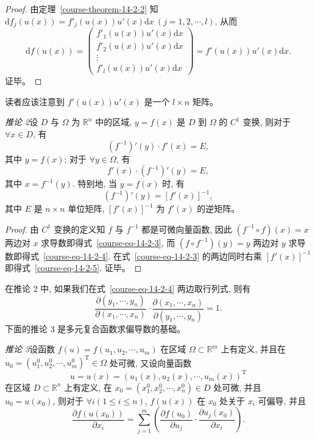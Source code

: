\documentclass[UTF8,12pt,a4paper,fontset=fandol]{ctexart}
\begin{document}
\begin{proof}\quad 由定理~\ref{course-theorem-14-2-2}  知 $\mathrm df_j(u(x))=f'_j(u(x))u'(x)\mathrm dx\ (j=1,2,\cdots,l)$, 从而
\[
  \mathrm df(u(x))=
  \begin{pmatrix}
    f'_1(u(x))u'(x)\mathrm dx\\
    f'_2(u(x))u'(x)\mathrm dx\\
    \vdots\\
    f'_l(u(x))u'(x)\mathrm dx
  \end{pmatrix}
  =f'(u(x))u'(x)\mathrm dx.
\]
证毕。

\end{proof}
\begin{remark}\quad 读者应该注意到 $f'(u(x))u'(x)$ 是一个 $l\times n$ 矩阵。

\end{remark}
\noindent\emph{推论 2}\quad 设 $D$ 与 $\Omega$ 为 $\mathbb R^n$ 中的区域, $y=f(x)$ 是 $D$ 到 $\Omega$ 的 $C^1$ 变换, 则对于 $\forall x\in D$, 有
\begin{equation}
  (f^{-1})'(y)\cdot f'(x)=E,
\label{course-eq-14-2-3}
\end{equation}
其中 $y=f(x)$; 对于 $\forall y\in\Omega$, 有
\begin{equation}
  f'(x)\cdot(f^{-1})'(y)=E,
\label{course-eq-14-2-4}
\end{equation}
其中 $x=f^{-1}(y)$. 特别地, 当 $y=f(x)$ 时, 有
\begin{equation}
  (f^{-1})'(y)=[f'(x)]^{-1},
\label{course-eq-14-2-5}
\end{equation}
其中 $E$ 是 $n\times n$ 单位矩阵, $[f'(x)]^{-1}$ 为 $f'(x)$ 的逆矩阵。

\begin{proof}\quad 由 $C^1$ 变换的定义知 $f$ 与 $f^{-1}$ 都是可微向量函数, 因此 $(f^{-1}\circ f)(x)=x$ 两边对 $x$ 求导数即得式~\eqref{course-eq-14-2-3}, 而 $(f\circ f^{-1})(y)=y$ 两边对 $y$ 求导数即得式~\eqref{course-eq-14-2-4}. 在式~\eqref{course-eq-14-2-3}  的两边同时右乘 $[f'(x)]^{-1}$ 即得式~\eqref{course-eq-14-2-5}. 证毕。

\end{proof}
\begin{remark}\quad 在推论 2 中, 如果我们在式~\eqref{course-eq-14-2-4}  两边取行列式, 则有
\begin{equation}
  \frac{\partial(y_1,\cdots,y_n)}{\partial(x_1,\cdots,x_n)}
  \cdot
  \frac{\partial(x_1,\cdots,x_n)}{\partial(y_1,\cdots,y_n)}
  =1.
\label{course-eq-14-2-6}
\end{equation}
下面的推论 3 是多元复合函数求偏导数的基础。

\end{remark}
\noindent\emph{推论 3}\quad 设函数 $f(u)=f(u_1,u_2,\cdots,u_m)$ 在区域 $\Omega\subset\mathbb R^m$ 上有定义, 并且在 $u_0=(u_1^0,u_2^0,\cdots,u_m^0)^\mathrm T\in\Omega$ 处可微, 又设向量函数
\[
  u=u(x)=(u_1(x),u_2(x),\cdots,u_m(x))^\mathrm T
\]
在区域 $D\subset\mathbb R^n$ 上有定义, 在 $x_0=(x_1^0,x_2^0,\cdots,x_n^0)\in D$ 处可微, 并且 $u_0=u(x_0)$, 则对于 $\forall i(1\leqslant i\leqslant n)$, $f(u(x))$ 在 $x_0$ 处关于 $x_i$ 可偏导, 并且
\[
  \frac{\partial f(u(x_0))}{\partial x_i}
  =\sum_{j=1}^m\left(
  \frac{\partial f(u_0)}{\partial u_j}\cdot
  \frac{\partial u_j(x_0)}{\partial x_i}\right).
\]
\end{document}
